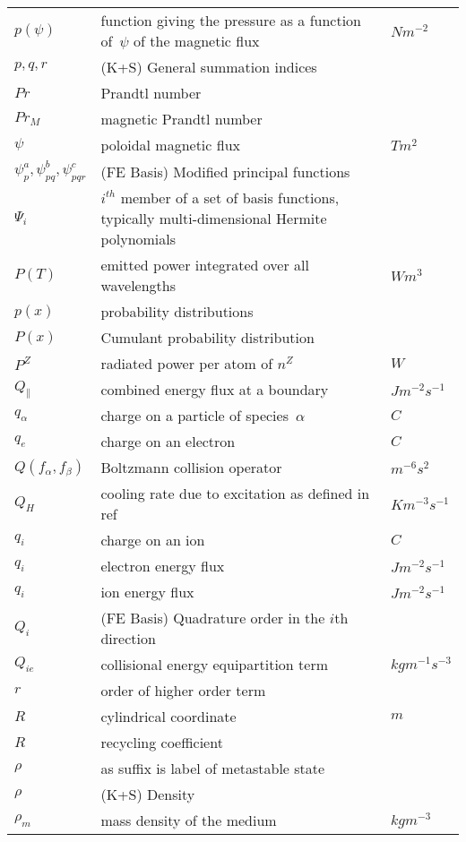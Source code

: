 \begin{longtable}{|p{3.0cm}|p{10.0cm}|p{3.0cm}|}
$p(\psi)$ & function giving the pressure as a function of~$\psi$ of the magnetic flux  & $N m^{-2}$ \\
$p,q,r$ &  (K+S) General summation indices & \\
$Pr$ & Prandtl number & \\
$Pr_M$ & magnetic Prandtl number & \\
$\psi$ & poloidal magnetic flux  & $T m^2$ \\
$\psi^a_p, \psi^b_{pq}, \psi^c_{pqr}$ &  (FE Basis) Modified principal functions & \\
$\Psi_i$ & $i^{th}$ member of a set of basis functions, typically multi-dimensional Hermite polynomials & \\
$P(T)$ & emitted power integrated over all wavelengths  & $W m^3$ \\
$p(x)$ & probability distributions   & \\
$P(x)$ & Cumulant probability distribution  & \\
$P^Z$ & radiated power per atom of $n^Z$  & $W$ \\
$Q_\|$ & combined energy flux at a boundary  & $J m^{-2} s^{-1}$ \\
$q_\alpha$ & charge on a particle of species~$\alpha$ & $C$ \\
$q_e$ & charge on an electron & $C$ \\
$Q(f_\alpha, f_\beta)$ & Boltzmann collision operator  & $m^{-6} s^2$ \\
$Q_H$ & cooling rate due to excitation as defined in ref~\cite{Ha13Benc}  & $K m^{-3} s^{-1}$ \\
$q_i$ & charge on an ion  & $C$ \\
$q_i$ & electron energy flux  & $J m^{-2} s^{-1}$ \\
$q_i$ & ion energy flux  & $J m^{-2} s^{-1}$ \\
$Q_i$ &  (FE Basis) Quadrature order in the $i$th direction & \\
$Q_{ie}$ & collisional energy equipartition term  & $kg m^{-1} s^{-3}$ \\
$r$ & order of higher order term  & \\
$R$ & cylindrical coordinate  & $m$ \\
$R$ & recycling coefficient & \\
$\rho$ & as suffix is label of metastable state & \\
$\rho$ &  (K+S) Density & \\
$\rho_m$ & mass density of the medium  & $kg m^{-3}$ \\

\end{longtable}
